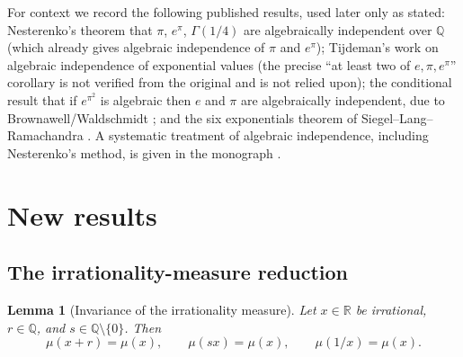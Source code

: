\documentclass[11pt]{amsart}
\newtheorem{lemma}[theorem]{Lemma}
\theoremstyle{definition}
\theoremstyle{remark}
\numberwithin{equation}{section}
\newcommand{\Q}{\mathbb{Q}}
\newcommand{\R}{\mathbb{R}}
\newcommand{\irr}{\mu}
\newcommand{\ee}{e}
\begin{document}
For context we record the following published results, used later only as stated: Nesterenko's theorem that $\pi$, $\ee^\pi$, $\Gamma(1/4)$ are algebraically independent over $\Q$ \cite{Nesterenko1996} (which already gives algebraic independence of $\pi$ and $\ee^\pi$); Tijdeman's work on algebraic independence of exponential values \cite{Tijdemann1971} (the precise ``at least two of $\ee,\pi,\ee^\pi$'' corollary is not verified from the original and is not relied upon); the conditional result that if $\ee^{\pi^2}$ is algebraic then $\ee$ and $\pi$ are algebraically independent, due to Brownawell/Waldschmidt \cite{Brownawell1974}; and the six exponentials theorem of Siegel--Lang--Ramachandra \cite{Lang1966,Ramachandra1968}. A systematic treatment of algebraic independence, including Nesterenko's method, is given in the monograph \cite{Zhu2024}.

\section{New results}\label{sec:new}

\subsection{The irrationality-measure reduction}

\begin{lemma}[Invariance of the irrationality measure]\label{lem:invariance}
Let $x\in\R$ be irrational, $r\in\Q$, and $s\in\Q\setminus\{0\}$. Then
\[
\irr(x+r)=\irr(x),\qquad \irr(sx)=\irr(x),\qquad \irr(1/x)=\irr(x).
\]
\end{lemma}
\end{document}
